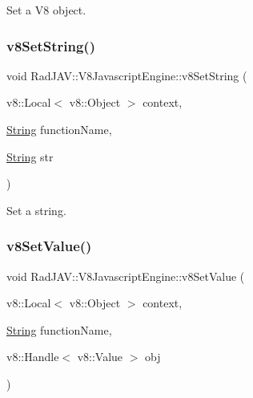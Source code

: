 Set a V8 object. 

\mbox{\label{class_rad_j_a_v_1_1_v8_javascript_engine_abe037103f725ff0bd14fdc07ec1d82c8}} 
\subsubsection{\texorpdfstring{v8\+Set\+String()}{v8SetString()}}
{\footnotesize\ttfamily void Rad\+J\+A\+V\+::\+V8\+Javascript\+Engine\+::v8\+Set\+String (\begin{DoxyParamCaption}\item[{v8\+::\+Local$<$ v8\+::\+Object $>$}]{context,  }\item[{\mbox{\hyperlink{class_rad_j_a_v_1_1_string}{String}}}]{function\+Name,  }\item[{\mbox{\hyperlink{class_rad_j_a_v_1_1_string}{String}}}]{str }\end{DoxyParamCaption})}



Set a string. 

\mbox{\label{class_rad_j_a_v_1_1_v8_javascript_engine_a8d4bf88adc107aab88240b3bf1506593}} 
\subsubsection{\texorpdfstring{v8\+Set\+Value()}{v8SetValue()}}
{\footnotesize\ttfamily void Rad\+J\+A\+V\+::\+V8\+Javascript\+Engine\+::v8\+Set\+Value (\begin{DoxyParamCaption}\item[{v8\+::\+Local$<$ v8\+::\+Object $>$}]{context,  }\item[{\mbox{\hyperlink{class_rad_j_a_v_1_1_string}{String}}}]{function\+Name,  }\item[{v8\+::\+Handle$<$ v8\+::\+Value $>$}]{obj }\end{DoxyParamCaption})}



